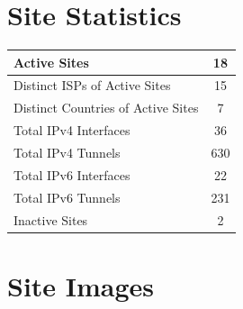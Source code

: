 \chapter{Site Statistics}
\label{cha:Site-Statistics}


\begin{small}
\begin{center}
\begin{longtable}{|c|c|}
 \hline
 \multicolumn{1}{|l|}{Active Sites} & 18 \\ \hline
 \multicolumn{1}{|l|}{Distinct ISPs of Active Sites} & 15 \\ \hline
 \multicolumn{1}{|l|}{Distinct Countries of Active Sites} & 7 \\ \hline
 \multicolumn{1}{|l|}{Total IPv4 Interfaces} & 36 \\ \hline
 \multicolumn{1}{|l|}{Total IPv4 Tunnels} & 630 \\ \hline
 \multicolumn{1}{|l|}{Total IPv6 Interfaces} & 22 \\ \hline
 \multicolumn{1}{|l|}{Total IPv6 Tunnels} & 231 \\ \hline
 \multicolumn{1}{|l|}{Inactive Sites} & 2 \\ \hline
\end{longtable}
\end{center}
\end{small}




\chapter{Site Images}
\label{cha:Images}


